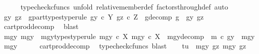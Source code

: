 \begin{isabellebody}
\ \ \ \ \isamarkupfalse%
\ {\isacharparenleft}{\kern0pt}typecheck{\isacharunderscore}{\kern0pt}cfuncs{\isacharcomma}{\kern0pt}\ unfold\ relative{\isacharunderscore}{\kern0pt}member{\isacharunderscore}{\kern0pt}def{}\ factors{\isacharunderscore}{\kern0pt}through{\isacharunderscore}{\kern0pt}def{}{\isacharcomma}{\kern0pt}\ auto{\isacharparenright}{\kern0pt}\isanewline
\ \ \isamarkupfalse%
\ \isamarkupfalse%
\ gy\ gz\ \ g{\isacharunderscore}{\kern0pt}part{\isacharunderscore}{\kern0pt}types{\isacharbrackleft}{\kern0pt}type{\isacharunderscore}{\kern0pt}rule{\isacharbrackright}{\kern0pt}{\isacharcolon}{\kern0pt}\ {\isachardoublequoteopen}gy\ {\isasymin}\isactrlsub c\ Y{\isachardoublequoteclose}\ {\isachardoublequoteopen}gz\ {\isasymin}\isactrlsub c\ Z{\isachardoublequoteclose}\ \ g{\isacharunderscore}{\kern0pt}decomp{\isacharcolon}{\kern0pt}\ {\isachardoublequoteopen}g\ {\isacharequal}{\kern0pt}\ {\isasymlangle}gy{\isacharcomma}{\kern0pt}\ gz{\isasymrangle}{\isachardoublequoteclose}\isanewline
\ \ \ \ \isamarkupfalse%
\ cart{\isacharunderscore}{\kern0pt}prod{\isacharunderscore}{\kern0pt}decomp\ \isamarkupfalse%
\ blast\isanewline
\ \ \isamarkupfalse%
\ \isamarkupfalse%
\ mgy{}\ mgy{}\ \ mgy{\isacharunderscore}{\kern0pt}types{\isacharbrackleft}{\kern0pt}type{\isacharunderscore}{\kern0pt}rule{\isacharbrackright}{\kern0pt}{\isacharcolon}{\kern0pt}\ {\isachardoublequoteopen}mgy{}\ {\isasymin}\isactrlsub c\ X{\isachardoublequoteclose}\ {\isachardoublequoteopen}mgy{}\ {\isasymin}\isactrlsub c\ X{\isachardoublequoteclose}\ \ mgy{\isacharunderscore}{\kern0pt}decomp{\isacharcolon}{\kern0pt}\ \ {\isachardoublequoteopen}m\ {\isasymcirc}\isactrlsub c\ gy\ {\isacharequal}{\kern0pt}\ {\isasymlangle}mgy{}{\isacharcomma}{\kern0pt}\ mgy{}{\isasymrangle}{\isachardoublequoteclose}\isanewline
\ \ \ \ \isamarkupfalse%
\ cart{\isacharunderscore}{\kern0pt}prod{\isacharunderscore}{\kern0pt}decomp\ \isamarkupfalse%
\ {\isacharparenleft}{\kern0pt}typecheck{\isacharunderscore}{\kern0pt}cfuncs{\isacharcomma}{\kern0pt}\ blast{\isacharparenright}{\kern0pt}\isanewline
\isanewline
\ \ \isamarkupfalse%
\ {\isachardoublequoteopen}{\isasymlangle}t{\isacharcomma}{\kern0pt}u{\isasymrangle}\ {\isacharequal}{\kern0pt}\ {\isasymlangle}{\isasymlangle}mgy{}{\isacharcomma}{\kern0pt}\ gz{\isasymrangle}{\isacharcomma}{\kern0pt}\ {\isasymlangle}mgy{}{\isacharcomma}{\kern0pt}\ gz{\isasymrangle}{\isasymrangle}{\isachardoublequoteclose}\isanewline

\end{isabellebody}

